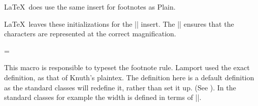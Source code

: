 %
%
%
%
%
%
%
%
%
%
%
 \begin{macro}{\footins}
  \LaTeX\ does use the same insert for footnotes as Plain.
    \begin{teX}
\newinsert\footins
    \end{teX}
%
 \LaTeX\ leaves these initializations for the |\footins| insert. The |\count\footins| ensures that
 the characters are represented at the correct magnification.

    \begin{teX}
\skip\footins=\bigskipamount %
\count{} %
\dimen\footins=8in %
    \end{teX}
 \end{macro}
%
%
 \begin{macro}{\footnoterule}
 This macro is responsible to typeset the footnote rule. Lamport used the exact
 definition, as that of Knuth’s plaintex.  The definition here is a default definition
 as the standard classes will redefine it, rather than set it up. (See \pageref{book:footnotes}).
In the standard classes for example the width is defined in terms of |\columnwidth|.

    \begin{teX}
\def\footnoterule{\kern-3\p@
  \hrule \@width 2in \kern 2.6\p@} %
    \end{teX}
 \end{macro}

